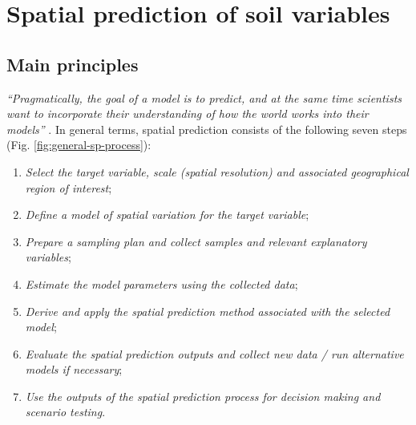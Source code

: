 \documentclass[graybox,natbib,nospthms,UStrade]{svmono}
\begin{document}
\hypertarget{spatial-prediction-of-soil-variables}{%
\section{Spatial prediction of soil variables}\label{spatial-prediction-of-soil-variables}}

\hypertarget{main-principles}{%
\subsection{Main principles}\label{main-principles}}

\emph{``Pragmatically, the goal of a model is to predict, and at the same time
scientists want to incorporate their understanding of how the world
works into their models''} \citep{cressie2011statistics}. In general terms,
spatial prediction consists of the following seven steps
(Fig. \ref{fig:general-sp-process}):

\begin{enumerate}
\def\labelenumi{\arabic{enumi}.}
\item
  \emph{Select the target variable, scale (spatial resolution) and
  associated geographical region of interest};
\item
  \emph{Define a model of spatial variation for the target variable};
\item
  \emph{Prepare a sampling plan and collect samples and relevant
  explanatory variables};
\item
  \emph{Estimate the model parameters using the collected data};
\item
  \emph{Derive and apply the spatial prediction method associated with the
  selected model};
\item
  \emph{Evaluate the spatial prediction outputs and collect new data / run
  alternative models if necessary};
\item
  \emph{Use the outputs of the spatial prediction process for decision
  making and scenario testing}.
\end{enumerate}
\end{document}
